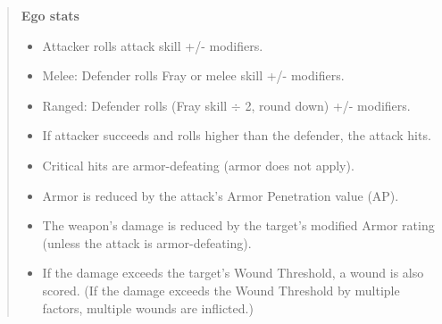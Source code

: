 \begin{quotation}
\textbf{Ego stats}
\begin{itemize}
\item Attacker rolls attack skill +/- modifiers.
\item Melee: Defender rolls Fray or melee skill +/- modifiers.
\item Ranged: Defender rolls (Fray skill $\div$ 2, round down) +/- modifiers.
\item If attacker succeeds and rolls higher than the defender, the attack hits.
\item Critical hits are armor-defeating (armor does not apply).
\item Armor is reduced by the attack’s Armor Penetration value (AP).
\item The weapon’s damage is reduced by the target’s modified Armor rating (unless the attack is armor-defeating).
\item If the damage exceeds the target’s Wound Threshold, a wound is also scored. (If the damage exceeds the Wound Threshold by multiple factors, multiple wounds are inflicted.)
\end{itemize}
\end{quotation}

